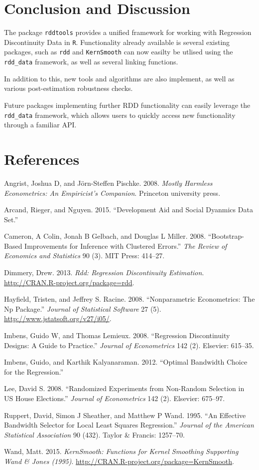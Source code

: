 \documentclass[article]{jss}
\begin{document}
\section{Conclusion and Discussion}\label{conclusion-and-discussion}

The package \texttt{rddtools} provides a unified framework for working
with Regression Discontinuity Data in \texttt{R}. Functionality already
available is several existing packages, such as \texttt{rdd} and
\texttt{KernSmooth} can now easilty be utlised using the
\texttt{rdd\_data} framework, as well as several linking functions.

In addition to this, new tools and algorithms are also implement, as
well as various post-estimation robustness checks.

Future packages implementing further RDD functionality can easily
leverage the \texttt{rdd\_data} framework, which allows users to quickly
access new functionality through a familiar API.

\section*{References}\label{references}

Angrist, Joshua D, and J{ö}rn-Steffen Pischke. 2008. \emph{Mostly
Harmless Econometrics: An Empiricist's Companion}. Princeton university
press.

Arcand, Rieger, and Nguyen. 2015. ``Development Aid and Social Dyanmics
Data Set.''

Cameron, A Colin, Jonah B Gelbach, and Douglas L Miller. 2008.
``Bootstrap-Based Improvements for Inference with Clustered Errors.''
\emph{The Review of Economics and Statistics} 90 (3). MIT Press:
414--27.

Dimmery, Drew. 2013. \emph{Rdd: Regression Discontinuity Estimation}.
\url{http://CRAN.R-project.org/package=rdd}.

Hayfield, Tristen, and Jeffrey S. Racine. 2008. ``Nonparametric
Econometrics: The Np Package.'' \emph{Journal of Statistical Software}
27 (5). \url{http://www.jstatsoft.org/v27/i05/}.

Imbens, Guido W, and Thomas Lemieux. 2008. ``Regression Discontinuity
Designs: A Guide to Practice.'' \emph{Journal of Econometrics} 142 (2).
Elsevier: 615--35.

Imbens, Guido, and Karthik Kalyanaraman. 2012. ``Optimal Bandwidth
Choice for the Regression.''

Lee, David S. 2008. ``Randomized Experiments from Non-Random Selection
in US House Elections.'' \emph{Journal of Econometrics} 142 (2).
Elsevier: 675--97.

Ruppert, David, Simon J Sheather, and Matthew P Wand. 1995. ``An
Effective Bandwidth Selector for Local Least Squares Regression.''
\emph{Journal of the American Statistical Association} 90 (432). Taylor
\& Francis: 1257--70.

Wand, Matt. 2015. \emph{KernSmooth: Functions for Kernel Smoothing
Supporting Wand \& Jones (1995)}.
\url{http://CRAN.R-project.org/package=KernSmooth}.
\end{document}
